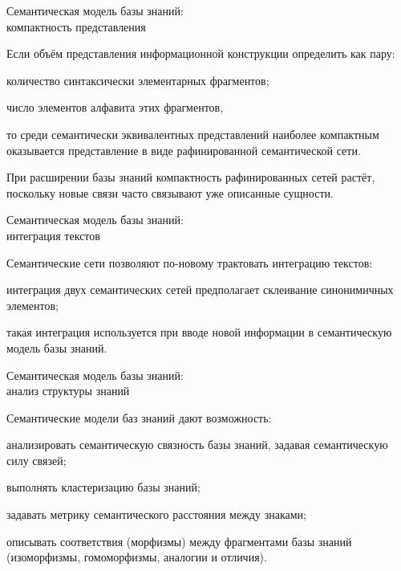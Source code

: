 \begin{frame}{Семантическая модель базы знаний:\\компактность представления}
	\topline
	\justifying
	
	Если объём представления информационной конструкции определить как пару:
	\begin{textitemize}
		\item количество синтаксически элементарных фрагментов;
		\item число элементов алфавита этих фрагментов,
	\end{textitemize}
	то среди семантически эквивалентных представлений наиболее компактным оказывается представление в виде рафинированной семантической сети.
	
	\medskip
	При расширении базы знаний компактность рафинированных сетей растёт, поскольку новые связи часто связывают уже описанные сущности.
	
\end{frame}


\begin{frame}{Семантическая модель базы знаний:\\интеграция текстов}
	\topline
	\justifying
	
	Семантические сети позволяют по-новому трактовать интеграцию текстов:
	\begin{textitemize}
		\item интеграция двух семантических сетей предполагает склеивание синонимичных элементов;
		\item такая интеграция используется при вводе новой информации в семантическую модель базы знаний.
	\end{textitemize}
	
\end{frame}


\begin{frame}{Семантическая модель базы знаний:\\анализ структуры знаний}
	\topline
	\justifying
	
	Семантические модели баз знаний дают возможность:
	\begin{textitemize}
		\item анализировать семантическую связность базы знаний, задавая семантическую силу связей;
		\item выполнять кластеризацию базы знаний;
		\item задавать метрику семантического расстояния между знаками;
		\item описывать соответствия (морфизмы) между фрагментами базы знаний (изоморфизмы, гомоморфизмы, аналогии и отличия).
	\end{textitemize}
	
\end{frame}


